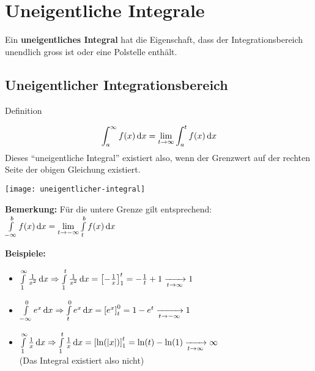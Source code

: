 \section{Uneigentliche Integrale}\label{sec:uneigentliche-integrale}

Ein \textbf{uneigentliches Integral} hat die Eigenschaft, dass der Integrationsbereich unendlich gross ist oder eine Polstelle enthält.

\subsection{Uneigentlicher Integrationsbereich}\label{subsec:uneigentlicher-integrationsbereich}

\begin{definition}{Definition}
    \begin{multicols}{2}
        \[\int_{a}^{\infty} f(x) \,\mathrm{d}x = \lim_{t \rightarrow \infty} \int_{a}^{t} f(x) \,\mathrm{d}x\] Dieses ``uneigentliche Integral'' existiert also, wenn der Grenzwert auf der rechten Seite der obigen Gleichung existiert.

        \begin{center}
            \texttt{[image: uneigentlicher-integral]}
        \end{center}
    \end{multicols}
\end{definition}

\textbf{Bemerkung:} Für die untere Grenze gilt entsprechend: $\int \limits_{-\infty}^{b} f(x) \,\mathrm{d}x = \lim \limits_{t \rightarrow -\infty} \int \limits_{t}^{b} f(x) \,\mathrm{d}x$

\textbf{Beispiele:}
\begin{multicols}{2}
    \begin{itemize}
        \item $\int \limits_{1}^{\infty} \frac{1}{x^2} \,\mathrm{d}x \Rightarrow \int \limits_{1}^{t} \frac{1}{x^2} \,\mathrm{d}x = \left[ -\frac{1}{x} \right]_{1}^{t} = -\frac{1}{t} + 1 \xrightarrow[t \to \infty]{} 1$
        \item $\int \limits_{-\infty}^{0} e^x \,\mathrm{d}x \Rightarrow \int \limits_{t}^{0} e^x \,\mathrm{d}x = \left[ e^x \right]_{t}^{0} = 1 - e^t \xrightarrow[t \to -\infty]{} 1$
        \item $\int \limits_{1}^{\infty} \frac{1}{x} \,\mathrm{d}x \Rightarrow \int \limits_{1}^{t} \frac{1}{x} \,\mathrm{d}x = \left[ \ln(|x|) \right]_{1}^{t} = \ln(t) - \ln(1) \xrightarrow[t \to \infty]{} \infty$ \\
        (Das Integral existiert also nicht)
    \end{itemize}
\end{multicols}

